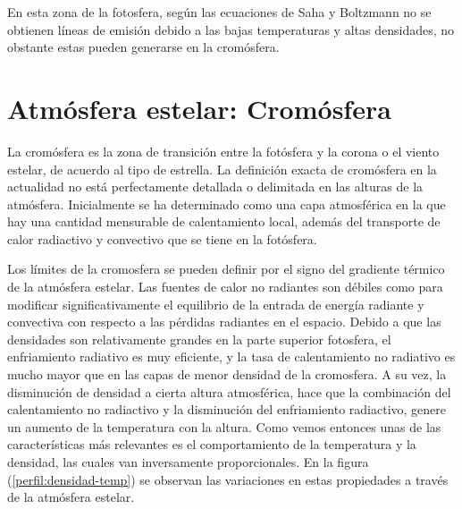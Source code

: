 \documentclass[12pt,oneside,openany,letter]{book}
\begin{document}
En esta zona de la fotosfera, según las ecuaciones de Saha y Boltzmann no se obtienen líneas de emisión debido a las bajas temperaturas y altas densidades, no obstante estas pueden generarse en la cromósfera.


\section{Atmósfera estelar: Cromósfera}

La cromósfera es la zona de transición entre la fotósfera y la corona o el viento estelar, de acuerdo al tipo de estrella. La definición exacta de cromósfera en la actualidad no está perfectamente detallada o delimitada en las alturas de la atmósfera. Inicialmente se ha determinado como una capa atmosférica en la que hay una cantidad mensurable de calentamiento local, además del transporte de calor radiactivo y convectivo que se tiene en la fotósfera. 

Los límites de la cromosfera se pueden definir por el signo del gradiente térmico de la atmósfera estelar\citep{linsky2017stellar}. Las fuentes de calor no radiantes son débiles como para modificar significativamente el equilibrio de la entrada de energía radiante y convectiva con respecto a las pérdidas radiantes en el espacio. Debido a que las densidades son relativamente grandes en la parte superior fotosfera, el enfriamiento radiativo es muy eficiente, y la tasa de calentamiento no radiativo es mucho mayor que en las capas de menor densidad de la cromosfera. A su vez, la disminución de densidad a cierta altura atmosférica, hace que la combinación del calentamiento no radiactivo y la disminución del enfriamiento radiactivo, genere un aumento de la temperatura con la altura. Como vemos entonces unas de las características más relevantes es el comportamiento de la temperatura y la densidad, las cuales van inversamente proporcionales. En la figura (\ref{perfil:densidad-temp}) se observan las variaciones en estas propiedades a través de la atmósfera estelar.
\end{document}

